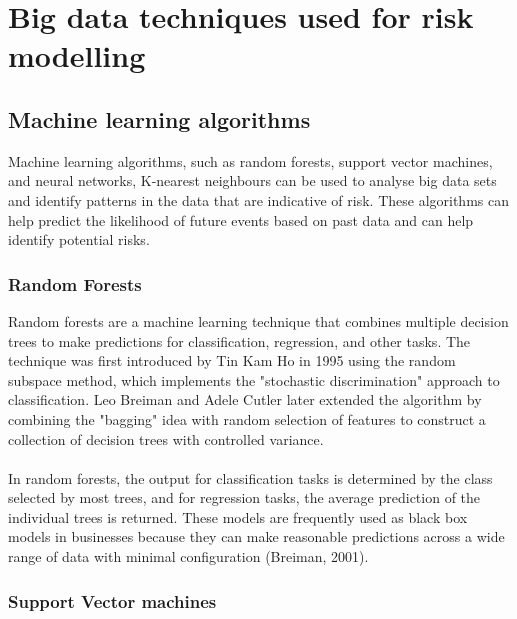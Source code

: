 \section{Big data techniques used for risk modelling}

\subsection{Machine learning algorithms}

Machine learning algorithms, such as random forests, support vector machines, and neural networks, K-nearest 
neighbours can be used to analyse big data sets and identify patterns in the data that are indicative of risk. 
These algorithms can help predict the likelihood of future events based on past data and can help identify 
potential risks.

\subsubsection{Random Forests}
Random forests are a machine learning technique that combines multiple decision trees to make predictions for 
classification, regression, and other tasks. The technique was first introduced by Tin Kam Ho in 1995 using the 
random subspace method, which implements the "stochastic discrimination" approach to classification. Leo Breiman 
and Adele Cutler later extended the algorithm by combining the "bagging" idea with random selection of features to 
construct a collection of decision trees with controlled variance.\\\\
In random forests, the output for classification tasks is determined by the class selected by most trees, and for 
regression tasks, the average prediction of the individual trees is returned. These models are frequently used as 
black box models in businesses because they can make reasonable predictions across a wide range of data with minimal 
configuration (Breiman, 2001).

\subsubsection{Support Vector machines}

